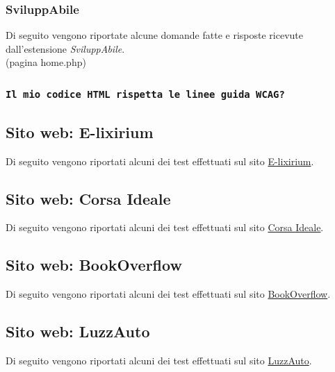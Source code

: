\subsubsection{SviluppAbile}
\noindent Di seguito vengono riportate alcune domande fatte e risposte ricevute dall'estensione \textit{SviluppAbile}. \newline
\\ \vspace{-0.5cm}
\noindent(pagina home.php)\\
\subsubsection*{\texttt{Il mio codice HTML rispetta le linee guida WCAG?}}
\begin{adjustwidth}{1cm}{1cm}
\end{adjustwidth}

\subsection{Sito web: E-lixirium}
\noindent Di seguito vengono riportati alcuni dei test effettuati sul sito \href{https://caa.studenti.math.unipd.it/abaldazz/?page=home}{E-lixirium}.

\subsection{Sito web: Corsa Ideale}
\noindent Di seguito vengono riportati alcuni dei test effettuati sul sito \href{https://caa.studenti.math.unipd.it/epinarel/}{Corsa Ideale}.

\subsection{Sito web: BookOverflow}
\noindent Di seguito vengono riportati alcuni dei test effettuati sul sito \href{https://caa.studenti.math.unipd.it/lribon/}{BookOverflow}.

\subsection{Sito web: LuzzAuto}
\noindent Di seguito vengono riportati alcuni dei test effettuati sul sito \href{https://caa.studenti.math.unipd.it/eartusi/index.php}{LuzzAuto}.


